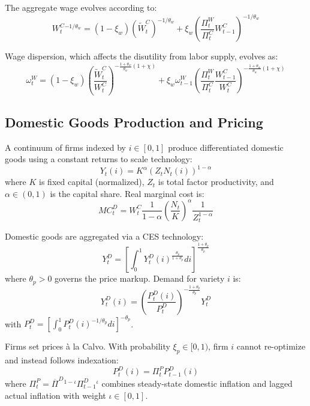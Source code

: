 \documentclass[12pt]{article}
\begin{document}
The aggregate wage evolves according to:
\begin{equation}
W_t^C{}^{-1/\theta_w} = (1-\xi_w) (\tilde{W}_t^C)^{-1/\theta_w} + \xi_w \left( \frac{\Pi_t^W}{\Pi_t^C} W_{t-1}^C \right)^{-1/\theta_w}
\end{equation}

Wage dispersion, which affects the disutility from labor supply, evolves as:
\begin{equation}
\omega_t^W = (1-\xi_w) \left( \frac{\tilde{W}_t^C}{W_t^C} \right)^{-\frac{1+\theta_w}{\theta_w}(1+\chi)} + \xi_w \omega_{t-1}^W \left( \frac{\Pi_t^W}{\Pi_t^C} \frac{W_{t-1}^C}{W_t^C} \right)^{-\frac{1+\theta_w}{\theta_w}(1+\chi)}
\end{equation}

\subsection{Domestic Goods Production and Pricing}

A continuum of firms indexed by $i \in [0,1]$ produce differentiated domestic goods using a constant returns to scale technology:
\begin{equation}
Y_t(i) = K^\alpha (Z_t N_t(i))^{1-\alpha}
\end{equation}
where $K$ is fixed capital (normalized), $Z_t$ is total factor productivity, and $\alpha \in (0,1)$ is the capital share. Real marginal cost is:
\begin{equation}\label{eq:mc}
MC_t^D = W_t^C \frac{1}{1-\alpha} \left(\frac{N_t}{K}\right)^\alpha \frac{1}{Z_t^{1-\alpha}}
\end{equation}

Domestic goods are aggregated via a CES technology:
\begin{equation}
Y_t^D = \left[ \int_0^1 Y_t^D(i)^{\frac{\theta_p}{1+\theta_p}} di \right]^{\frac{1+\theta_p}{\theta_p}}
\end{equation}
where $\theta_p > 0$ governs the price markup. Demand for variety $i$ is:
\begin{equation}
Y_t^D(i) = \left( \frac{P_t^D(i)}{P_t^D} \right)^{-\frac{1+\theta_p}{\theta_p}} Y_t^D
\end{equation}
with $P_t^D = \left[ \int_0^1 P_t^D(i)^{-1/\theta_p} di \right]^{-\theta_p}$.

Firms set prices à la Calvo. With probability $\xi_p \in [0,1)$, firm $i$ cannot re-optimize and instead follows indexation:
\begin{equation}
P_t^D(i) = \Pi_t^P P_{t-1}^D(i)
\end{equation}
where $\Pi_t^P = \overline{\Pi}^D {}^{1-\iota} \Pi_{t-1}^D {}^{\iota}$ combines steady-state domestic inflation and lagged actual inflation with weight $\iota \in [0,1]$.
\end{document}
